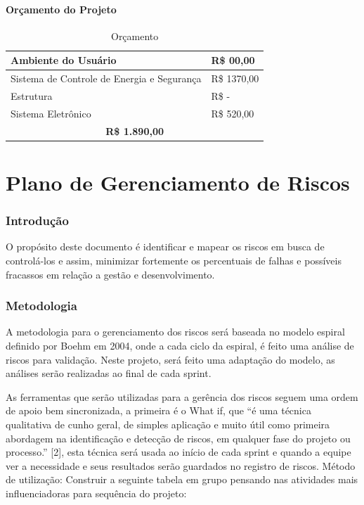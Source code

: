 \begin{apendicesenv}
\subsubsection{Orçamento do Projeto}
\begin{table}[htp]
    \centering
    \caption{Orçamento}
    \label{orcamento}
    \begin{tabular}{|l|l|}
    \hline
    Ambiente do Usuário & R\$ 00,00 \\ \hline
    Sistema de Controle de Energia e Segurança & R\$ 1370,00 \\ \hline
    Estrutura & R\$ - \\ \hline
    Sistema Eletrônico & R\$ 520,00 \\ \hline
    \multicolumn{2}{|c|}{\textbf{R\$ 1.890,00}} \\ \hline
    \end{tabular}
\end{table}
    

\chapter{Plano de Gerenciamento de Riscos}

\subsection{Introdução}
O propósito deste documento é identificar e mapear os riscos em busca de controlá-los e assim, minimizar fortemente os percentuais de falhas e possíveis fracassos em relação a gestão e desenvolvimento.

\subsection{Metodologia}
A metodologia para o gerenciamento dos riscos será baseada no modelo espiral definido por Boehm em 2004, onde a cada ciclo da espiral, é feito uma análise de riscos para validação. Neste projeto, será feito uma adaptação do modelo, as análises serão realizadas ao final de cada sprint.

As ferramentas que serão utilizadas para a gerência dos riscos seguem uma ordem de apoio bem sincronizada, a primeira é o What if, que “é uma técnica qualitativa de cunho geral, de simples aplicação e muito útil como primeira abordagem na identificação e detecção de riscos, em qualquer fase do projeto ou processo.” [2], esta técnica será usada ao início de cada sprint e quando a equipe ver a necessidade e seus resultados serão guardados no registro de riscos. Método de utilização:
Construir a seguinte tabela em grupo pensando nas atividades mais influenciadoras para sequência do projeto:


\end{apendicesenv}
